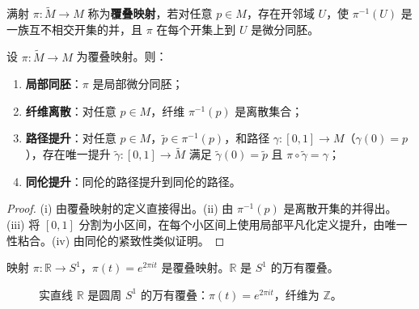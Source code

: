 \begin{definition}[覆叠空间]\label{def:covering_space}
满射 $\pi: \tilde{M} \to M$ 称为\textbf{覆叠映射}，若对任意 $p \in M$，存在开邻域 $U$，使 $\pi^{-1}(U)$ 是一族互不相交开集的并，且 $\pi$ 在每个开集上到 $U$ 是微分同胚。
\end{definition}

\begin{lemma}[覆叠映射的基本性质]\label{lem:covering_properties}
设 $\pi: \tilde{M} \to M$ 为覆叠映射。则：
\begin{enumerate}[label=(\roman*)]
    \item \textbf{局部同胚}：$\pi$ 是局部微分同胚；
    \item \textbf{纤维离散}：对任意 $p \in M$，纤维 $\pi^{-1}(p)$ 是离散集合；
    \item \textbf{路径提升}：对任意 $p \in M$，$\tilde{p} \in \pi^{-1}(p)$，和路径 $\gamma: [0,1] \to M$（$\gamma(0) = p$），存在唯一提升 $\tilde{\gamma}: [0,1] \to \tilde{M}$ 满足 $\tilde{\gamma}(0) = \tilde{p}$ 且 $\pi \circ \tilde{\gamma} = \gamma$；
    \item \textbf{同伦提升}：同伦的路径提升到同伦的路径。
\end{enumerate}
\end{lemma}

\begin{proof}
(i) 由覆叠映射的定义直接得出。(ii) 由 $\pi^{-1}(p)$ 是离散开集的并得出。(iii) 将 $[0,1]$ 分割为小区间，在每个小区间上使用局部平凡化定义提升，由唯一性粘合。(iv) 由同伦的紧致性类似证明。
\end{proof}

\begin{theorem}[实直线覆叠圆周]\label{thm:covering_R_S1}
映射 $\pi: \mathbb{R} \to S^1$，$\pi(t) = e^{2\pi i t}$ 是覆叠映射。$\mathbb{R}$ 是 $S^1$ 的万有覆叠。
\end{theorem}

\begin{figure}[htbp]
\centering
{}
\caption{实直线 $\mathbb{R}$ 是圆周 $S^1$ 的万有覆叠：$\pi(t)=e^{2\pi i t}$，纤维为 $\mathbb{Z}$。}
\label{fig:covering_R_S1}
\end{figure}


